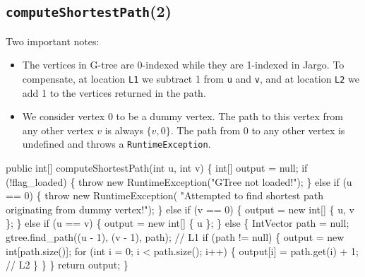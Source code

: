 \documentclass{article}
\def\nwendcode{\endtrivlist \endgroup}      %
\let\nwdocspar=\par
\begin{document}
\subsection{{\tt{}\protect{}computeShortestPath}(2)}
Two important notes:
\begin{itemize}
\item The vertices in G-tree are 0-indexed while they are 1-indexed in Jargo.  To
compensate, at location {\tt{}L1} we subtract 1 from {\tt{}u} and {\tt{}v}, and at
location {\tt{}L2} we add 1 to the vertices returned in the path.
\item We consider vertex 0 to be a dummy vertex. The path to this vertex
from any other vertex $v$ is always $\{v, 0\}$. The path from 0 to any other
vertex is undefined and throws a {\tt{}RuntimeException}.
\end{itemize}
\nwenddocs{}\endmoddef{}
public int[] computeShortestPath(int u, int v) \{
  int[] output = null;
  if (!flag_loaded) \{
    throw new RuntimeException("GTree not loaded!");
  \} else if (u == 0) \{
    throw new RuntimeException(
        "Attempted to find shortest path originating from dummy vertex!");
  \} else if (v == 0) \{
    output = new int[] \{ u, v \};
  \} else if (u == v) \{
    output = new int[] \{ u \};
  \} else \{
    IntVector path = null;
    gtree.find_path((u - 1), (v - 1), path);        // L1
    if (path != null) \{
      output = new int[path.size()];
      for (int i = 0; i < path.size(); i++) \{
        output[i] = path.get(i) + 1;                // L2
      \}
    \}
  \}
  return output;
\}
\eatline
{}\nwendcode{}\nwdocspar
\end{document}
